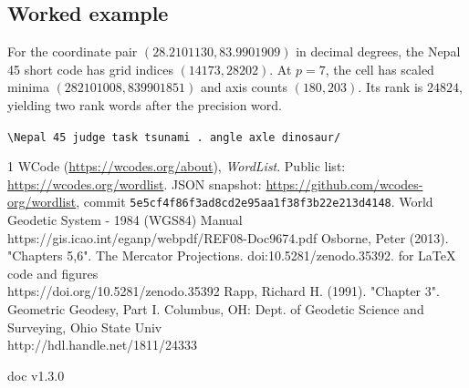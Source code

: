 \documentclass[conference]{IEEEtran}
\begin{document}
\subsection{Worked example}
For the coordinate pair $(28.2101130,83.9901909)$ in decimal degrees, the Nepal 45 short code has grid indices $(14173,28202)$. At $p=7$, the cell has scaled minima $(282101008,839901851)$ and axis counts $(180,203)$. Its rank is $24824$, yielding two rank words after the precision word.
\begin{center}
\small\texttt{\textbackslash{}\hspace{0.55em}Nepal 45 judge task tsunami . angle axle dinosaur\hspace{0.55em}/}
\end{center}

\begin{thebibliography}{1}
 WCode (\url{https://wcodes.org/about}), \emph{WordList}.
Public list: \url{https://wcodes.org/wordlist}.
JSON snapshot: \url{https://github.com/wcodes-org/wordlist},
commit \texttt{5e5cf4f86f3ad8cd2e95aa1f38f3b22e213d4148}.
  World Geodetic System - 1984 (WGS84) Manual\\
https://gis.icao.int/eganp/webpdf/REF08-Doc9674.pdf
 Osborne, Peter (2013). "Chapters 5,6". The Mercator Projections. doi:10.5281/zenodo.35392. for LaTeX code and figures \\
https://doi.org/10.5281/zenodo.35392
 Rapp, Richard H. (1991). "Chapter 3". Geometric Geodesy, Part I. Columbus, OH: Dept. of Geodetic Science and Surveying, Ohio State Univ \\
http://hdl.handle.net/1811/24333
\end{thebibliography}

\vspace*{\fill}
\hspace*{\fill} doc v1.3.0
\end{document}
